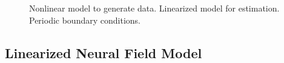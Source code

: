 \documentclass[conference,onecolumn]{IEEEtran}
\begin{document}
\begin{figure}[htbp]
	\centering
	\caption{Nonlinear model to generate data. Linearized model for estimation. Periodic boundary conditions.}
	\label{fig:label}
\end{figure}
\newpage



\subsection{Linearized Neural Field Model}
\end{document}
